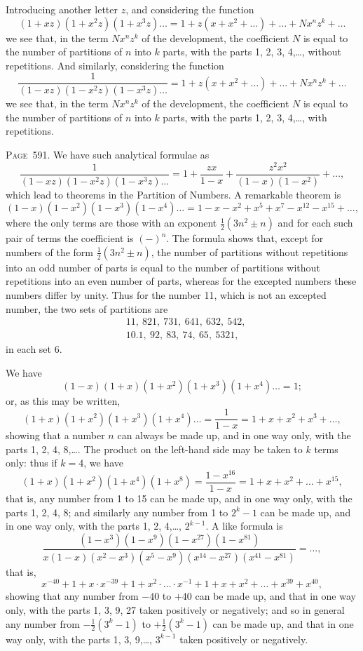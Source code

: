 \documentclass[11pt,a4paper]{book}
\begin{document}
Introducing another letter $z$, and considering the function
\[
(1+xz)(1+x^2z)(1+x^3z)\ldots = 1+z(x+x^2+\ldots)+\ldots+Nx^nz^k+\ldots
\]
we see that, in the term $Nx^nz^k$ of the development, the coefficient $N$ is equal to the number of partitions of $n$ into $k$ parts, with the parts 1, 2, 3, 4,\ldots, without repetitions. And similarly, considering the function
\[
\frac{1}{(1-xz)(1-x^2z)(1-x^3z)\ldots} = 1+z(x+x^2+\ldots)+\ldots+Nx^nz^k+\ldots
\]
we see that, in the term $Nx^nz^k$ of the development, the coefficient $N$ is equal to the number of partitions of $n$ into $k$ parts, with the parts 1, 2, 3, 4,\ldots, with repetitions.

\newpage
\noindent\textsc{Page~591.} We have such analytical formulae as
\[
\frac{1}{(1-xz)(1-x^2z)(1-x^3z)\ldots} = 1+\frac{zx}{1-x}+\frac{z^2x^2}{(1-x)(1-x^2)}+\ldots,
\]
which lead to theorems in the Partition of Numbers. A remarkable theorem is
\[
(1-x)(1-x^2)(1-x^3)(1-x^4)\ldots = 1-x-x^2+x^5+x^7-x^{12}-x^{15}+\ldots,
\]
where the only terms are those with an exponent $\tfrac12(3n^2\pm n)$ and for each such pair of terms the coefficient is $(-)^n$. The formula shows that, except for numbers of the form $\tfrac12(3n^2\pm n)$, the number of partitions without repetitions into an odd number of parts is equal to the number of partitions without repetitions into an even number of parts, whereas for the excepted numbers these numbers differ by unity. Thus for the number 11, which is not an excepted number, the two sets of partitions are
\begin{align*}
&11,\ 821,\ 731,\ 641,\ 632,\ 542,\\
&10.1,\ 92,\ 83,\ 74,\ 65,\ 5321,
\end{align*}
in each set 6.

We have
\[
(1-x)(1+x)(1+x^2)(1+x^3)(1+x^4)\ldots = 1;
\]
or, as this may be written,
\[
(1+x)(1+x^2)(1+x^3)(1+x^4)\ldots = \frac{1}{1-x} = 1+x+x^2+x^3+\ldots,
\]
showing that a number $n$ can always be made up, and in one way only, with the parts 1, 2, 4, 8,\ldots. The product on the left-hand side may be taken to $k$ terms only: thus if $k=4$, we have
\[
(1+x)(1+x^2)(1+x^4)(1+x^8) = \frac{1-x^{16}}{1-x} = 1+x+x^2+\ldots+x^{15},
\]
that is, any number from 1 to 15 can be made up, and in one way only, with the parts 1, 2, 4, 8; and similarly any number from 1 to $2^k-1$ can be made up, and in one way only, with the parts 1, 2, 4,\ldots, $2^{k-1}$. A like formula is
\[
\frac{(1-x^3)(1-x^9)(1-x^{27})(1-x^{81})}{x(1-x)(x^2-x^3)(x^5-x^9)(x^{14}-x^{27})(x^{41}-x^{81})} = \ldots,
\]
that is,
\[
x^{-40}+1+x\cdot x^{-39}+1+x^2\cdot\ldots\cdot x^{-1}+1+x+x^2+\ldots+x^{39}+x^{40},
\]
showing that any number from $-40$ to $+40$ can be made up, and that in one way only, with the parts 1, 3, 9, 27 taken positively or negatively; and so in general any number from $-\tfrac12(3^k-1)$ to $+\tfrac12(3^k-1)$ can be made up, and that in one way only, with the parts 1, 3, 9,\ldots, $3^{k-1}$ taken positively or negatively.
\end{document}

